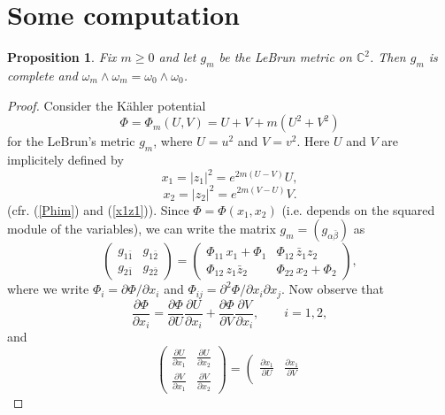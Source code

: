\documentclass[11pt, reqno]{amsart}
\newtheorem{Aprop}{Proposition}
\begin{document}
\section{Some computation}
\begin{Aprop}\label{wellknown}
Fix $m\geq 0$ and let $g_m$ be the LeBrun  metric on ${\mathbb{C}}^2$. Then $g_m$ is complete and $\omega_m\wedge\omega_m=\omega_0\wedge\omega_0$.
\end{Aprop}
\begin{proof}
Consider the K\"ahler potential
$$\Phi=\Phi_m(U,V)=U+V+m(U^2+V^2)$$ for the LeBrun's  metric $g_m$,
where $U=u^2$ and $V=v^2$. Here $U$ and $V$ are implicitely defined by
\begin{equation}\label{x_1=}
x_1=|z_1|^2=e^{2m(U-V)}U,
\end{equation}
\begin{equation}\label{x_2=}
x_2=|z_2|^2=e^{2m(V-U)}V.
\end{equation}
(cfr. (\ref{Phim}) and (\ref{x1z1})).
Since $\Phi=\Phi(x_1,x_2)$ (i.e. depends on the squared module of the variables), we can write the matrix $g_m =(g_{\alpha\bar\beta})$ as
\begin{equation}\label{metricg}
\left(
\begin{array}{cc}
g_{1\bar 1} & g_{1\bar 2}   \\
g_{2\bar 1}  & g_{2\bar 2}
\end{array}
\right)=
\left(
\begin{array}{cc}
\Phi_{11}\,x_1+\Phi_{1}  &\Phi_{12}\,\bar z_1 z_2    \\
 \Phi_{12}\, z_1\bar z_2 & \Phi_{22}\,x_2+\Phi_2
\end{array}
\right),
\end{equation}
where we write $\Phi_i={\partial} \Phi/{\partial} x_i$ and $\Phi_{ij}={\partial}^2 \Phi/{\partial} x_i {\partial} x_j$. 
Now  observe that
$$\frac{{\partial} \Phi}{{\partial} x_i}=\frac{{\partial} \Phi}{{\partial} U}\frac{{\partial} U}{{\partial} x_i}+\frac{{\partial} \Phi}{{\partial} V}\frac{{\partial} V}{{\partial} x_i}, \qquad i=1,2,$$
and
\begin{equation}
\left(
\begin{array}{cc}
\frac{{\partial} U}{{\partial} x_1}  &\frac{{\partial} U}{{\partial} x_2}    \\
\frac{{\partial} V}{{\partial} x_1} &\frac{{\partial} V}{{\partial} x_2}
\end{array}
\right)=\left(
\begin{array}{cc}
\frac{{\partial} x_1}{{\partial} U}  &\frac{{\partial} x_1}{{\partial} V}    \\

\end{array}
\end{equation}
\end{proof}
\end{document}
